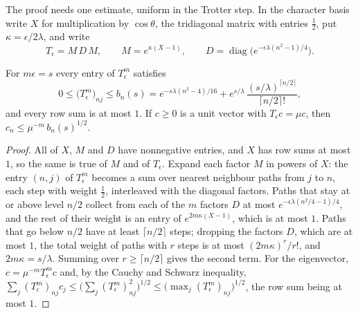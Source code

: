 The proof needs one estimate, uniform in the Trotter step. In the character basis write $X$ for multiplication by $\cos\theta$, the tridiagonal matrix with entries $\frac12$, put $\kappa=\epsilon/2\lambda$, and write
\[
T_\epsilon=M\,D\,M,\qquad M=e^{\kappa(X-1)},\qquad D=\operatorname{diag}\big(e^{-\epsilon\lambda(n^2-1)/4}\big).
\]

\begin{lemma}[domination]\label{lem:domination}
For $m\epsilon=s$ every entry of $T_\epsilon^m$ satisfies
\[
0\le\big(T_\epsilon^m\big)_{nj}\le b_n(s)=e^{-s\lambda(n^2-4)/16}+e^{s/\lambda}\,\frac{(s/\lambda)^{\lceil n/2\rceil}}{\lceil n/2\rceil!},
\]
and every row sum is at most $1$. If $c\ge0$ is a unit vector with $T_\epsilon c=\mu c$, then $c_n\le\mu^{-m}\,b_n(s)^{1/2}$.
\end{lemma}

\begin{proof}
All of $X$, $M$ and $D$ have nonnegative entries, and $X$ has row sums at most $1$, so the same is true of $M$ and of $T_\epsilon$. Expand each factor $M$ in powers of $X$: the entry $(n,j)$ of $T_\epsilon^m$ becomes a sum over nearest neighbour paths from $j$ to $n$, each step with weight $\frac12$, interleaved with the diagonal factors. Paths that stay at or above level $n/2$ collect from each of the $m$ factors $D$ at most $e^{-\epsilon\lambda(n^2/4-1)/4}$, and the rest of their weight is an entry of $e^{2m\kappa(X-1)}$, which is at most $1$. Paths that go below $n/2$ have at least $\lceil n/2\rceil$ steps; dropping the factors $D$, which are at most $1$, the total weight of paths with $r$ steps is at most $(2m\kappa)^r/r!$, and $2m\kappa=s/\lambda$. Summing over $r\ge\lceil n/2\rceil$ gives the second term. For the eigenvector, $c=\mu^{-m}T_\epsilon^mc$ and, by the Cauchy and Schwarz inequality, $\sum_j(T_\epsilon^m)_{nj}c_j\le\big(\sum_j(T_\epsilon^m)_{nj}^2\big)^{1/2}\le\big(\max_j(T_\epsilon^m)_{nj}\big)^{1/2}$, the row sum being at most $1$.
\end{proof}

